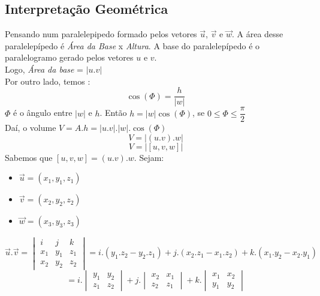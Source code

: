 \documentclass[ ]{article}
\begin{document}
		\subsection{Interpretação Geométrica}
			Pensando num paralelepipedo formado pelos vetores $\overrightarrow{u}$, $\overrightarrow{v}$ e $\overrightarrow{w}$. A área desse paralelepípedo é \textit{Área da Base} x \textit{Altura}. A base do paralelepípedo é o paralelogramo gerado pelos vetores $u$ e $ v$.\\
			Logo, \textit{Área da base} = $|u.v|$\\
			Por outro lado, temos :
			$$\cos(\Phi) = \dfrac{h}{|w|}$$
			$\Phi$ é o ângulo entre $|w|$ e $h$.
			Então $h=|w|\cos(\Phi)$, se $0 \leq \Phi \leq \dfrac{\pi}{2}$\\
			Daí, o volume $V = A.h = |u.v|.|w|.\cos(\Phi)$
			$$V=|(u.v).w|$$
			$$V= |[u,v,w]|$$
			Sabemos que $[u,v,w] =(u.v).w$. Sejam:
			\begin{itemize}
				\item $\overrightarrow{u} =(x_1,y_1,z_1)$
				\item $\overrightarrow{v} =(x_2,y_2,z_2)$
				\item $\overrightarrow{w}= (x_3,y_3,z_3)$
			\end{itemize}
			$$\overrightarrow{u}.\overrightarrow{v}= \begin{vmatrix}
			i&j&k\\
			x_1&y_1&z_1\\
			x_2&y_2&z_2
			\end{vmatrix}
			= i.(y_1.z_2-y_2.z_1)+j.(x_2.z_1-x_1.z_2)+k.(x_1.y_2-x_2.y_1)$$
			$$= i. \begin{vmatrix}
			y_1 & y_2\\
			z_1&z_2
			\end{vmatrix}
			+ j.
			\begin{vmatrix}
				x_2&x_1\\
				z_2&z_1
			\end{vmatrix}
			+k.
			\begin{vmatrix}
				x_1&x_2\\
				y_1&y_2
			\end{vmatrix}
			$$
			
\end{document}
